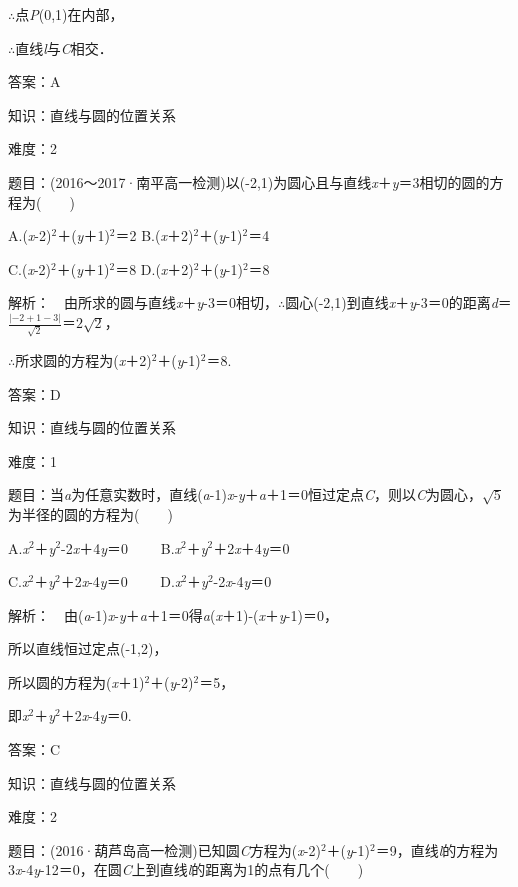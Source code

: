 \documentclass{article} %
\begin{document}
$\mathrm{\therefore}$点\textit{P}(0,1)在内部，

$\mathrm{\therefore}$直线\textit{l}与\textit{C}相交．

答案：A

知识：直线与圆的位置关系

难度：2

题目：(2016～2017·南平高一检测)以(-2,1)为圆心且与直线\textit{x}＋\textit{y}＝3相切的圆的方程为(　　)

A.(\textit{x}-2)${}^{2}$＋(\textit{y}＋1)${}^{2}$＝2 B.(\textit{x}＋2)${}^{2}$＋(\textit{y}-1)${}^{2}$＝4

C.(\textit{x}-2)${}^{2}$＋(\textit{y}＋1)${}^{2}$＝8 D.(\textit{x}＋2)${}^{2}$＋(\textit{y}-1)${}^{2}$＝8

解析：　由所求的圆与直线\textit{x}＋\textit{y}-3＝0相切，$\mathrm{\therefore}$圆心(-2,1)到直线\textit{x}＋\textit{y}-3＝0的距离\textit{d}＝$\frac{|-2+1-3|}{\sqrt{2}}$＝$2\sqrt{2}$，

$\mathrm{\therefore}$所求圆的方程为(\textit{x}＋2)${}^{2}$＋(\textit{y}-1)${}^{2}$＝8.

答案：D

知识：直线与圆的位置关系

难度：1

题目：当\textit{a}为任意实数时，直线(\textit{a}-1)\textit{x}-\textit{y}＋\textit{a}＋1＝0恒过定点\textit{C}，则以\textit{C}为圆心，$\sqrt{5}$为半径的圆的方程为(　　)

A.\textit{x}${}^{2}$＋\textit{y}${}^{2}$-2\textit{x}＋4\textit{y}＝0　　 B.\textit{x}${}^{2}$＋\textit{y}${}^{2}$＋2\textit{x}＋4\textit{y}＝0

C.\textit{x}${}^{2}$＋\textit{y}${}^{2}$＋2\textit{x}-4\textit{y}＝0　　 D.\textit{x}${}^{2}$＋\textit{y}${}^{2}$-2\textit{x}-4\textit{y}＝0

解析：　由(\textit{a}-1)\textit{x}-\textit{y}＋\textit{a}＋1＝0得\textit{a}(\textit{x}＋1)-(\textit{x}＋\textit{y}-1)＝0，

所以直线恒过定点(-1,2)，

所以圆的方程为(\textit{x}＋1)${}^{2}$＋(\textit{y}-2)${}^{2}$＝5，

即\textit{x}${}^{2}$＋\textit{y}${}^{2}$＋2\textit{x}-4\textit{y}＝0.

答案：C

知识：直线与圆的位置关系

难度：2

题目：(2016·葫芦岛高一检测)已知圆\textit{C}方程为(\textit{x}-2)${}^{2}$＋(\textit{y}-1)${}^{2}$＝9，直线\textit{l}的方程为3\textit{x}-4\textit{y}-12＝0，在圆\textit{C}上到直线\textit{l}的距离为1的点有几个(　　)
\end{document}
